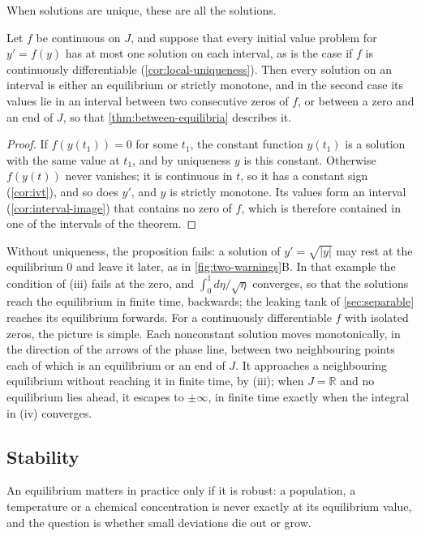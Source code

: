 When solutions are unique, these are all the solutions.

\begin{proposition}
\label{prop:autonomous-monotone}
Let $f$ be continuous on $J$, and suppose that every initial value problem for $y'=f(y)$ has at most one solution on each interval, as is the case if $f$ is continuously differentiable (\cref{cor:local-uniqueness}). Then every solution on an interval is either an equilibrium or strictly monotone, and in the second case its values lie in an interval between two consecutive zeros of $f$, or between a zero and an end of $J$, so that \cref{thm:between-equilibria} describes it.
\end{proposition}

\begin{proof}
If $f(y(t_1))=0$ for some $t_1$, the constant function $y(t_1)$ is a solution with the same value at $t_1$, and by uniqueness $y$ is this constant. Otherwise $f(y(t))$ never vanishes; it is continuous in $t$, so it has a constant sign (\cref{cor:ivt}), and so does $y'$, and $y$ is strictly monotone. Its values form an interval (\cref{cor:interval-image}) that contains no zero of $f$, which is therefore contained in one of the intervals of the theorem.
\end{proof}

Without uniqueness, the proposition fails: a solution of $y'=\sqrt{|y|}$ may rest at the equilibrium $0$ and leave it later, as in \cref{fig:two-warnings}B. In that example the condition of (iii) fails at the zero, and $\int_0^1d\eta/\sqrt\eta$ converges, so that the solutions reach the equilibrium in finite time, backwards; the leaking tank of \cref{sec:separable} reaches its equilibrium forwards. For a continuously differentiable $f$ with isolated zeros, the picture is simple. Each nonconstant solution moves monotonically, in the direction of the arrows of the phase line, between two neighbouring points each of which is an equilibrium or an end of $J$. It approaches a neighbouring equilibrium without reaching it in finite time, by (iii); when $J=\mathbb R$ and no equilibrium lies ahead, it escapes to $\pm\infty$, in finite time exactly when the integral in (iv) converges.

\subsection{Stability}

An equilibrium matters in practice only if it is robust: a population, a temperature or a chemical concentration is never exactly at its equilibrium value, and the question is whether small deviations die out or grow.

